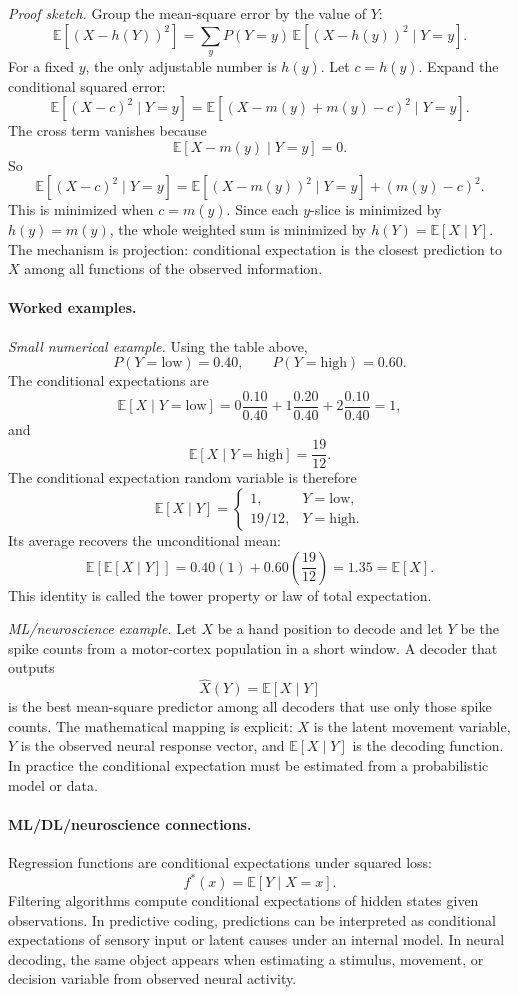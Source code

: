 \emph{Proof sketch.}
Group the mean-square error by the value of \(Y\):
\[
\mathbb{E}\!\left[(X-h(Y))^2\right]
=\sum_y P(Y=y)\,
\mathbb{E}\!\left[(X-h(y))^2\mid Y=y\right].
\]
For a fixed \(y\), the only adjustable number is \(h(y)\). Let \(c=h(y)\). Expand the conditional squared error:
\[
\mathbb{E}\!\left[(X-c)^2\mid Y=y\right]
=\mathbb{E}\!\left[(X-m(y)+m(y)-c)^2\mid Y=y\right].
\]
The cross term vanishes because
\[
\mathbb{E}[X-m(y)\mid Y=y]=0.
\]
So
\[
\mathbb{E}\!\left[(X-c)^2\mid Y=y\right]
=\mathbb{E}\!\left[(X-m(y))^2\mid Y=y\right]+(m(y)-c)^2.
\]
This is minimized when \(c=m(y)\). Since each \(y\)-slice is minimized by \(h(y)=m(y)\), the whole weighted sum is minimized by \(h(Y)=\mathbb{E}[X\mid Y]\). The mechanism is projection: conditional expectation is the closest prediction to \(X\) among all functions of the observed information.

\paragraph{Worked examples.}
\emph{Small numerical example.} Using the table above,
\[
P(Y=\mathrm{low})=0.40,\qquad P(Y=\mathrm{high})=0.60.
\]
The conditional expectations are
\[
\mathbb{E}[X\mid Y=\mathrm{low}]
=0\frac{0.10}{0.40}+1\frac{0.20}{0.40}+2\frac{0.10}{0.40}
=1,
\]
and
\[
\mathbb{E}[X\mid Y=\mathrm{high}]
=\frac{19}{12}.
\]
The conditional expectation random variable is therefore
\[
\mathbb{E}[X\mid Y]
=
\begin{cases}
1, & Y=\mathrm{low},\\
19/12, & Y=\mathrm{high}.
\end{cases}
\]
Its average recovers the unconditional mean:
\[
\mathbb{E}[\mathbb{E}[X\mid Y]]
=0.40(1)+0.60\left(\frac{19}{12}\right)
=1.35
=\mathbb{E}[X].
\]
This identity is called the tower property or law of total expectation.

\emph{ML/neuroscience example.} Let \(X\) be a hand position to decode and let \(Y\) be the spike counts from a motor-cortex population in a short window. A decoder that outputs
\[
\widehat X(Y)=\mathbb{E}[X\mid Y]
\]
is the best mean-square predictor among all decoders that use only those spike counts. The mathematical mapping is explicit: \(X\) is the latent movement variable, \(Y\) is the observed neural response vector, and \(\mathbb{E}[X\mid Y]\) is the decoding function. In practice the conditional expectation must be estimated from a probabilistic model or data.

\paragraph{ML/DL/neuroscience connections.}
Regression functions are conditional expectations under squared loss:
\[
f^*(x)=\mathbb{E}[Y\mid X=x].
\]
Filtering algorithms compute conditional expectations of hidden states given observations. In predictive coding, predictions can be interpreted as conditional expectations of sensory input or latent causes under an internal model. In neural decoding, the same object appears when estimating a stimulus, movement, or decision variable from observed neural activity.

